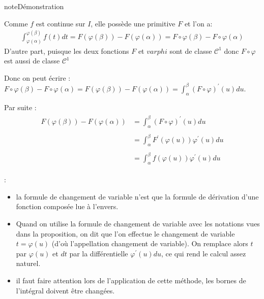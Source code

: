 \documentclass[letterpaper,10pt,french]{jupyterBook}
\begin{document}
\begin{sphinxadmonition}{note}{Démonstration}

\sphinxAtStartPar
Comme \(f\) est continue sur \(I\), elle possède une primitive \(F\) et l’on a:
\begin{equation*}
\begin{split}
\int_{\varphi(\alpha)}^{\varphi(\beta)} f(t)dt = F(\varphi(\beta)) - F(\varphi(\alpha)) = F \circ\varphi(\beta) - F \circ\varphi(\alpha)
\end{split}
\end{equation*}
\sphinxAtStartPar
D’autre part, puisque les deux fonctions \(F\) et \(varphi\) sont de classe \(\mathcal C^1\) donc \(F \circ\varphi\) est aussi de classe \(\mathcal C^1\)

\sphinxAtStartPar
Donc on peut écrire : \( F \circ\varphi(\beta) - F \circ\varphi(\alpha) = F(\varphi(\beta)) - F(\varphi(\alpha)) = \int_\alpha^\beta  (F \circ\varphi)^{'}(u) du\).

\sphinxAtStartPar
Par suite :
\begin{equation*}
\begin{split}
\begin{aligned}
F(\varphi(\beta)) - F(\varphi(\alpha)) &= \int_\alpha^\beta  (F \circ\varphi)^{'}(u) du \\ \\
& = \int_\alpha^\beta  F^{'}(\varphi(u)) \varphi^{'}(u) du \\ \\
& = \int_\alpha^\beta f(\varphi(u)) \varphi^{'}(u)du
\end{aligned}
\end{split}
\end{equation*}\end{sphinxadmonition}

\sphinxAtStartPar
{}:
\begin{itemize}
\item {} 
\sphinxAtStartPar
la formule de changement de variable n’est que la formule de dérivation d’une fonction composée lue à l’envers.

\item {} 
\sphinxAtStartPar
Quand on utilise la formule de changement de variable avec les notations vues dans la proposition, on dit que l’on effectue le changement de variable \(t=\varphi(u)\) (d’où l’appellation changement de variable). On remplace alors \(t\) par \(\varphi(u)\) et \(dt\) par la différentielle \(\varphi^{'}(u)du\), ce qui rend le calcul assez naturel.

\item {} 
\sphinxAtStartPar
il faut faire attention lors de l’application de cette méthode, les bornes de l’intégral doivent être changées.

\end{itemize}
\end{document}
